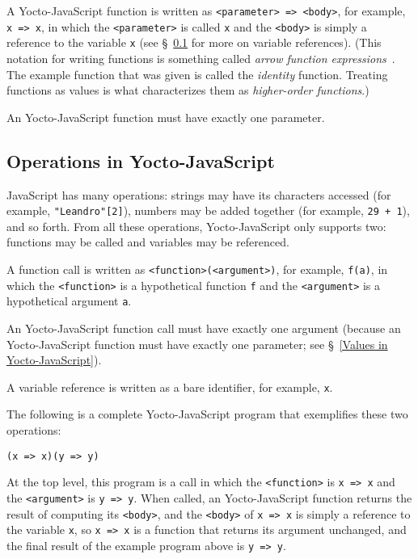 \documentclass[12pt, oneside]{book}
\begin{document}
A Yocto-JavaScript function is written as \verb!<parameter> => <body>!, for example, \texttt{x => x}, in which the \verb!<parameter>! is called \texttt{x} and the \verb!<body>! is simply a reference to the variable \texttt{x} (see §~\ref{Operations in Yocto-JavaScript} for more on variable references). (This notation for writing functions is something called \emph{arrow function expressions}~\cite{arrow-function-expressions}. The example function that was given is called the \emph{identity} function. Treating functions as values is what characterizes them as \emph{higher-order functions}.)

An Yocto-JavaScript function must have exactly one parameter.

\subsection{Operations in Yocto-JavaScript}
\label{Operations in Yocto-JavaScript}

JavaScript has many operations: strings may have its characters accessed (for example, \texttt{"Leandro"[2]}), numbers may be added together (for example, \texttt{29 + 1}), and so forth. From all these operations, Yocto-JavaScript only supports two: functions may be called and variables may be referenced.

A function call is written as \verb!<function>(<argument>)!, for example, \texttt{f(a)}, in which the \verb!<function>! is a hypothetical function \texttt{f} and the \verb!<argument>! is a hypothetical argument \texttt{a}.

An Yocto-JavaScript function call must have exactly one argument (because an Yocto-JavaScript function must have exactly one parameter; see §~\ref{Values in Yocto-JavaScript}).

A variable reference is written as a bare identifier, for example, \texttt{x}.

The following is a complete Yocto-JavaScript program that exemplifies these two operations:

\begin{verbatim}
(x => x)(y => y)
\end{verbatim}

At the top level, this program is a call in which the \verb!<function>! is \texttt{x => x} and the \verb!<argument>! is \texttt{y => y}. When called, an Yocto-JavaScript function returns the result of computing its \verb!<body>!, and the \verb!<body>! of \texttt{x => x} is simply a reference to the variable \texttt{x}, so \texttt{x => x} is a function that returns its argument unchanged, and the final result of the example program above is \texttt{y => y}.
\end{document}
